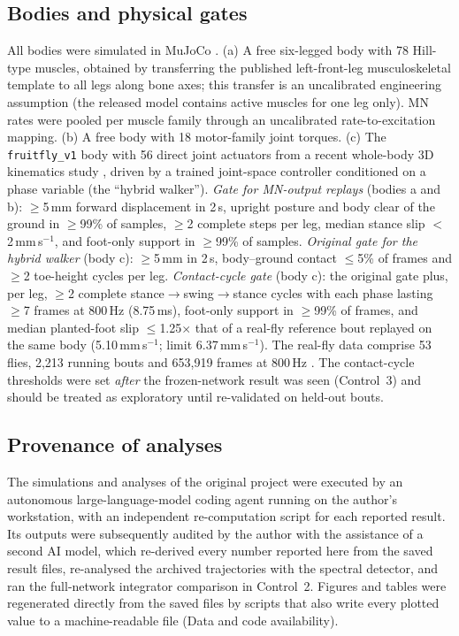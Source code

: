 \documentclass[11pt]{article}
\begin{document}
\subsection{Bodies and physical gates}
All bodies were simulated in MuJoCo \citep{todorov2012mujoco}. (a) A free six-legged body with 78 Hill-type muscles, obtained by transferring the published left-front-leg musculoskeletal template \citep{ozdil2025flymimic} to all legs along bone axes; this transfer is an uncalibrated engineering assumption (the released model contains active muscles for one leg only). MN rates were pooled per muscle family through an uncalibrated rate-to-excitation mapping. (b) A free body with 18 motor-family joint torques. (c) The \texttt{fruitfly\_v1} body with 56 direct joint actuators from a recent whole-body 3D kinematics study \citep{ispizua2026kinematics}, driven by a trained joint-space controller conditioned on a phase variable (the ``hybrid walker'').
\emph{Gate for MN-output replays} (bodies a and b): $\geq$5\,mm forward displacement in 2\,s, upright posture and body clear of the ground in $\geq$99\% of samples, $\geq$2 complete steps per leg, median stance slip $<$2\,mm\,s$^{-1}$, and foot-only support in $\geq$99\% of samples.
\emph{Original gate for the hybrid walker} (body c): $\geq$5\,mm in 2\,s, body--ground contact $\leq$5\% of frames and $\geq$2 toe-height cycles per leg.
\emph{Contact-cycle gate} (body c): the original gate plus, per leg, $\geq$2 complete stance$\rightarrow$swing$\rightarrow$stance cycles with each phase lasting $\geq$7 frames at 800\,Hz (8.75\,ms), foot-only support in $\geq$99\% of frames, and median planted-foot slip $\leq$1.25$\times$ that of a real-fly reference bout replayed on the same body (5.10\,mm\,s$^{-1}$; limit 6.37\,mm\,s$^{-1}$). The real-fly data comprise 53 flies, 2,213 running bouts and 653,919 frames at 800\,Hz \citep{ispizua2026kinematics}. The contact-cycle thresholds were set \emph{after} the frozen-network result was seen (Control~3) and should be treated as exploratory until re-validated on held-out bouts.

\subsection{Provenance of analyses}
The simulations and analyses of the original project were executed by an autonomous large-language-model coding agent running on the author's workstation, with an independent re-computation script for each reported result. Its outputs were subsequently audited by the author with the assistance of a second AI model, which re-derived every number reported here from the saved result files, re-analysed the archived trajectories with the spectral detector, and ran the full-network integrator comparison in Control~2. Figures and tables were regenerated directly from the saved files by scripts that also write every plotted value to a machine-readable file (Data and code availability).
\end{document}

